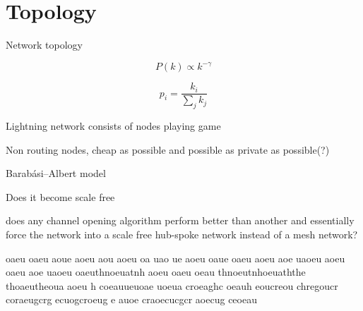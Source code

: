 \section{Topology}

Network topology

\[ P(k) \propto k^{-\gamma} \]

\[ p_i = \dfrac{k_i}{\sum_{j}^{}k_j}  \]


Lightning network consists of nodes playing game

Non routing nodes, cheap as possible and possible as private as possible(?) 

Barabási–Albert model

Does it become scale free

does any channel opening algorithm perform better than another and essentially force the network into a scale free hub-spoke network instead of a mesh network?
 
oaeu
oaeu
aoue
aoeu
aou
aoeu
oa
uao
ue
aoeu
oaue
oaeu
aoeu
aoe
uaoeu aoeu oaeu aoe uaoeu oaeuthnoeuatnh 
aoeu oaeu oeau thnoeutnhoeuaththe thoaeutheoua 
aoeu h
coeauueuoae uoeua croeaghc oeauh eoucreou chregoucr 
coraeugcrg ecuogcroeug e auoe craoecucgcr aoecug ceoeau 


\newpage
\onecolumn

